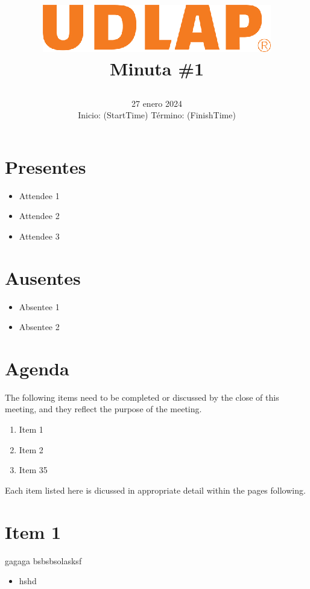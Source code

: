 \documentclass[12pt, a4paper]{article}
\title{
	\includegraphics[width=10cm]{udlap.eps}\vspace{2ex} 
	\\ 
	\titlefont Minuta \#1\vspace{-3ex}
	\author{} %
}
\date{
\huge 27 enero 2024 \\ \vspace{0.5ex}
\large Inicio: (StartTime) \quad Término: (FinishTime)}
\begin{document}
\maketitle %
\begin{minipage}[t]{0.4\textwidth}
\section*{Presentes}
\begin{itemize}
\item Attendee 1
\item Attendee 2
\item Attendee 3
\end{itemize}
\end{minipage}
\begin{minipage}[t]{0.5\textwidth}
\section*{Ausentes}
\begin{itemize}
\item Absentee 1
\item Absentee 2
\end{itemize}
\end{minipage}

\section*{Agenda}
The following items need to be completed or discussed by the close of this meeting, and they reflect the purpose of the meeting.
\begin{enumerate}
\item Item 1
\item Item 2
\item Item 35
\end{enumerate}
Each item listed here is dicussed in appropriate detail within the pages following.
\section{Item 1}
gagaga bsbsbsolasksf
\begin{itemize}
	\item hshd
\end{itemize}
\end{document}
